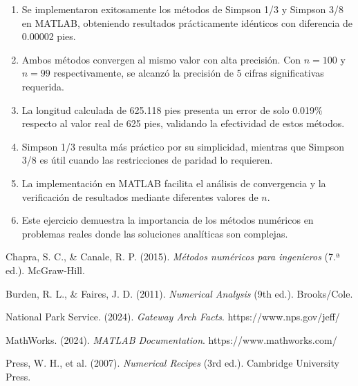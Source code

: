\documentclass[conference]{IEEEtran}
\begin{document}
\begin{enumerate}
    \item Se implementaron exitosamente los métodos de Simpson 1/3 y Simpson 3/8 en MATLAB, obteniendo resultados prácticamente idénticos con diferencia de 0.00002 pies.

    \item Ambos métodos convergen al mismo valor con alta precisión. Con $n=100$ y $n=99$ respectivamente, se alcanzó la precisión de 5 cifras significativas requerida.

    \item La longitud calculada de 625.118 pies presenta un error de solo 0.019\% respecto al valor real de 625 pies, validando la efectividad de estos métodos.

    \item Simpson 1/3 resulta más práctico por su simplicidad, mientras que Simpson 3/8 es útil cuando las restricciones de paridad lo requieren.

    \item La implementación en MATLAB facilita el análisis de convergencia y la verificación de resultados mediante diferentes valores de $n$.

    \item Este ejercicio demuestra la importancia de los métodos numéricos en problemas reales donde las soluciones analíticas son complejas.
\end{enumerate}

\begin{thebibliography}{00}
 Chapra, S. C., \& Canale, R. P. (2015). \textit{Métodos numéricos para ingenieros} (7.ª ed.). McGraw-Hill.

 Burden, R. L., \& Faires, J. D. (2011). \textit{Numerical Analysis} (9th ed.). Brooks/Cole.

 National Park Service. (2024). \textit{Gateway Arch Facts}. https://www.nps.gov/jeff/

 MathWorks. (2024). \textit{MATLAB Documentation}. https://www.mathworks.com/

 Press, W. H., et al. (2007). \textit{Numerical Recipes} (3rd ed.). Cambridge University Press.
\end{thebibliography}
\end{document}
